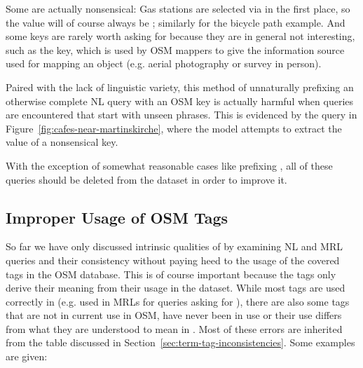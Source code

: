 Some are actually nonsensical: Gas stations are selected via
 in the first place, so the  value will of
course always be ; similarly for the bicycle path example. And some
keys are rarely worth asking for because they are in general not interesting,
such as the  key, which is used by OSM mappers to give the
information source used for mapping an object (e.g. aerial photography or survey
in person).

Paired with the lack of linguistic variety, this method of unnaturally prefixing
an otherwise complete NL query with an OSM key is actually harmful when queries
are encountered that start with unseen phrases. This is evidenced by the query
 in
Figure~\ref{fig:cafes-near-martinskirche}, where the model attempts to extract
the value of a nonsensical  key.

With the exception of somewhat reasonable cases like prefixing , all of
these queries should be deleted from the dataset in order to improve it.

\subsection{Improper Usage of OSM Tags}
\label{sec:improper-osm-tags}

So far we have only discussed intrinsic qualities of \nlmapstwo{} by examining
NL and MRL queries and their consistency without paying heed to the usage of the
covered tags in the OSM database. This is of course important because the tags
only derive their meaning from their usage in the dataset. While most tags are
used correctly in \nlmapstwo{} (e.g.  used in MRLs for
queries asking for ), there are also some tags that are not
in current use in OSM, have never been in use or their use differs from what
they are understood to mean in \nlmapstwo{}. Most of these errors are inherited
from the table discussed in Section~\ref{sec:term-tag-inconsistencies}. Some
examples are given:

